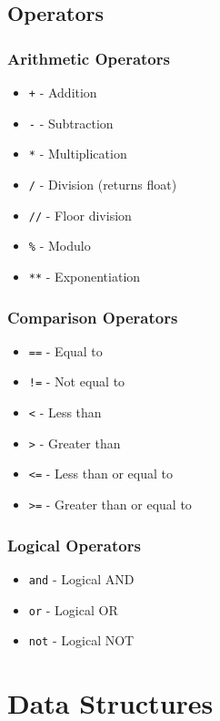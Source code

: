 \documentclass[11pt]{article}
\begin{document}
\subsection{Operators}

\subsubsection{Arithmetic Operators}
\begin{itemize}
    \item \texttt{+} - Addition
    \item \texttt{-} - Subtraction
    \item \texttt{*} - Multiplication
    \item \texttt{/} - Division (returns float)
    \item \texttt{//} - Floor division
    \item \texttt{\%} - Modulo
    \item \texttt{**} - Exponentiation
\end{itemize}

\subsubsection{Comparison Operators}
\begin{itemize}
    \item \texttt{==} - Equal to
    \item \texttt{!=} - Not equal to
    \item \texttt{<} - Less than
    \item \texttt{>} - Greater than
    \item \texttt{<=} - Less than or equal to
    \item \texttt{>=} - Greater than or equal to
\end{itemize}

\subsubsection{Logical Operators}
\begin{itemize}
    \item \texttt{and} - Logical AND
    \item \texttt{or} - Logical OR
    \item \texttt{not} - Logical NOT
\end{itemize}

\section{Data Structures}
\end{document}

